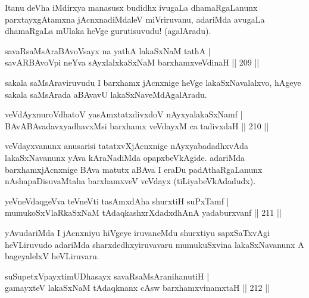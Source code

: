 \begin{artha}
Itanu deVha iMdirxya manasusx budidhx ivugaLa dhamaRgaLanunx parxtayxgAtamxna jAcnxnadiMdaleV miVriruvanu, adariMda avugaLa dhamaRgaLa mUlaka heVge gurutisuvudu! (agalAradu).
\end{artha}

\begin{shl}
savaRsaMsAraBAvoV\s sayx na yathA lakaSxNaM tathA |\\
savARBAvoV\s pi neYva sAyxlalxkaSxNaM barxhamxveVdinaH \hfill || 209 ||
\end{shl}

\begin{artha}
sakala saMsAraviruvudu I barxhamx jAcnxnige heVge lakaSxNavalalxvo, hAgeye sakala saMsArada aBAvavU lakaSxNaveMdAgalAradu.
\end{artha}


\begin{shl}
veVdAyxnuroVdhatoV yasAmxtatxdivxdoV nAyxyalakaSxNamf |\\
BAvABAvadavxyadhavxMsi barxhamx veVdayxM ca tadivxdaH \hfill || 210 ||
\end{shl}

\begin{artha}
veVdayxvanunx anusarisi tatatxvXjAcnxnige nAyxyabadadhxvAda lakaSxNavanunx yAva kAraNadiMda opapxbeVkAgide. adariMda barxhamxjAcnxnige BAva matutx aBAva I eraDu padAthaRgaLanunx nAshapaDisuvaMtaha barxhamxveV veVdayx (tiLiyabeVkAdadudx).
\end{artha}

\begin{shl}
yeVneVdaqgeVva teVneVti tasAmxdAha shurxtiH suPxTamf |\\
mumukoSxVlaRkaSxNaM tAdaqkashxrXdadxdhAnA yadaburxvanf \hfill || 211 ||
\end{shl}

\begin{artha}
yAvudariMda I jAcnxniyu hiVgeye iruvaneMdu shurxtiyu sapxSaTxvAgi heVLi\-ruvudo adariMda sharxdedhxyiruvavaru mumukuSxvina lakaSxNavanunx A bageyalelxV heVLiruvaru.
\end{artha}%


\begin{shl}
suSupetxV\s payxtimUDhasayx savaRsaMsAranihanutiH |\\
gamayxteV lakaSxNaM tAdaqknanx cAsw barxhamxvinamxtaH \hfill || 212 ||
\end{shl}


